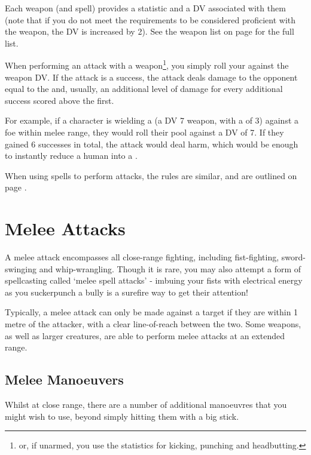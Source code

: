 Each weapon (and spell) provides a  statistic and a DV associated with them (note that if you do not meet the requirements to be considered proficient with the weapon, the DV is increased by 2). See the weapon list on page \pageref{S:Weapons} for the full list. 

When performing an attack with a weapon\footnote{or, if unarmed, you use the  statistics for kicking, punching and headbutting.}, you simply roll your  against the weapon DV. If the attack is a success, the attack deals damage to the opponent equal to the  and, usually, an additional level of damage for every additional success scored above the first. 

For example, if a character is wielding a  (a DV 7 weapon, with a  of 3) against a foe within melee range, they would roll their  pool against a DV of 7. If they gained 6 successes in total, the attack would deal  harm, which would be enough to instantly reduce a human into a . 

When using spells to perform attacks, the rules are similar, and are outlined on page \pageref{S:CastingSpells}.

\section{Melee Attacks}

A melee attack encompasses all close-range fighting, including fist-fighting, sword-swinging and whip-wrangling. Though it is rare, you may also attempt a form of spellcasting called `melee spell attacks' - imbuing your fists with electrical energy as you suckerpunch a bully is a surefire way to get their attention!

Typically, a melee attack can only be made against a target if they are within 1 metre of the attacker, with a clear line-of-reach between the two. Some weapons, as well as larger creatures, are able to perform melee attacks at an extended range. 




\subsection{Melee Manoeuvers}


Whilst at close range, there are a number of additional manoeuvres that you might wish to use, beyond simply hitting them with a big stick.

